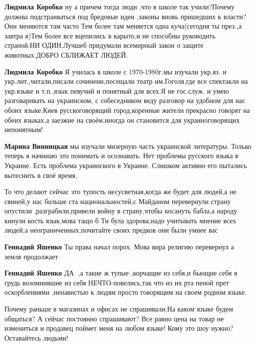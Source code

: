\begin{itemize}
\textbf{Людмила Коробко} ну а причем тогда люди ,что в школе так учили?Почему должны подстраиваться под бредовые идеи ,законы вновь пришедших к власти?Они меняются там часто
Тем более там меняется одна куча(сегодня ты през.,а завтра я)Тем более все вцепились в карыто,и не способны руководить страной.НИ ОДИН.Лучшеб придумали всемирный закон о защите животных.ДОБРО СБЛИЖАЕТ ЛЮДЕЙ.

\textbf{Людмила Коробко} Я училась в школе с 1970-1980г.мы изучали укр.яз. и укр.лит.,читали,писали сочинени,посещали театр им.Гоголя,где все спектакли на укр.языке и т.п.,язык певучий и понятный для всех.Я не гос.служ. и умею разговаривать на украинском, с собеседником веду разговор на удобном для нас обоих языке.Киев русскоговорящий город,коренные жители прекрасно говорят на обеих языках,а заезжие на своём,иногда он становится для украиноговорящих непонятным!

\textbf{Марина Винницкая} мы изучали мизерную часть украинской литературы. Только теперь я начинаю это понимать и осознавать.
Нет проблемы русского языка в Украине. Есть проблема украинского в Украине. Слишком активно его пытались вытеснить в своё время.
\end{itemize}


То что делают сейчас это тупость несусветная,когда же будет для людей,а не
свиней,у нас больше ста национальностей,с Майданом перевернули страну опустили
,разграбили,привели войну в страну,чтобы косануть бабла,а народу кинули кость
язык,мова тащо б Ти була здорова,надо учитывать мнение всех людей,а
неограниченных,почитайте своих предков они были умнее вас

\begin{itemize}

\textbf{Геннадий Яшенко} Ты права начал порох. Мова вира религию перевернул а земля продолжает

\textbf{Геннадий Яшенко} ДА 💯,а такие ж тупые ,корчащие из себя,и бьющие себя
в грудь возомнившие из себя НЕЧТО-повелись,так что из их рта пеной прет
оскорблениями ,ненавистью к людям просто говорящим на своем родном языке.
\end{itemize}


Почему раньше в магазинах и офисах не спрашивали:На каком языке будем общаться?
А сейчас постоянно спрашивают? Все равно цена на товар не измениться и продавец
поймет меня на любом языке! Кому это шоу нужно? Оставайтесь людьми!

